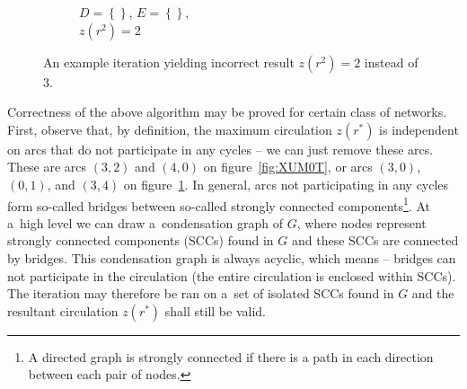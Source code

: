 \documentclass[paper=a4,parskip=half,DIV=12]{leetcode}
\begin{document}
\begin{figure}[H]
\begin{subfigure}[t]{0.32\textwidth}
    \centering
    \caption{$D=\left\lbrace \right\rbrace$,
             $E=\left\lbrace \right\rbrace$, \\
             $z(r^2) = 2$}
  \end{subfigure}
  \caption{An example iteration yielding incorrect result $z(r^2) = 2$ instead of $3$.}
  \label{fig:CT5N5}
\end{figure}

Correctness of the above algorithm may be proved for certain class of networks.
First, observe that, by definition, the maximum circulation $z(r^{*})$ is
independent on arcs that do not participate in any cycles -- we can just remove
these arcs. These are arcs $(3,2)$ and $(4,0)$ on figure~\ref{fig:XUM0T}, or
arcs $(3,0)$, $(0,1)$, and $(3,4)$ on figure~\ref{fig:CT5N5}. In general, arcs
not participating in any cycles form so-called bridges between so-called
strongly connected components\footnote{A directed graph is strongly connected
if there is a path in each direction between each pair of nodes.}. At a~high
level we can draw a~condensation graph of $G$, where nodes represent strongly
connected components (SCCs) found in $G$ and these SCCs are connected by
bridges. This condensation graph is always acyclic, which means -- bridges
can not participate in the circulation (the entire circulation is enclosed
within SCCs). The iteration may therefore be ran on a~set of isolated SCCs
found in $G$ and the resultant circulation $z(r^{*})$ shall still be valid.
\end{document}
